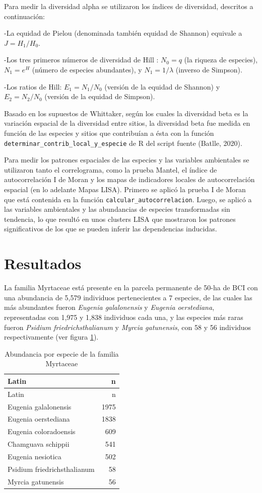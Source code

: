 \documentclass[11pt,]{article}
\begin{document}
Para medir la diversidad alpha se utilizaron los índices de diversidad,
descritos a continuación:

-La equidad de Pielou (denominada también equidad de Shannon) equivale a
\(J=H_1/H_0\).

-Los tres primeros números de diversidad de Hill : \(N_0 =q\) (la
riqueza de especies), \(N_1 = e^H\) (número de especies abundantes), y
\(N_1 = 1/\)\(\lambda\) (inverso de Simpson).

-Los ratios de Hill: \(E_1 = N_1/N_0\) (versión de la equidad de
Shannon) y \(E_2 = N_2/N_0\) (versión de la equidad de Simpson).

Basado en los supuestos de Whittaker, según los cuales la diversidad
beta es la variación espacial de la diversidad entre sitios, la
diversidad beta fue medida en función de las especies y sitios que
contribuían a ésta con la función
\texttt{determinar\_contrib\_local\_y\_especie} de R del script fuente
(Batlle, 2020).

Para medir los patrones espaciales de las especies y las variables
ambientales se utilizaron tanto el correlograma, como la prueba Mantel,
el índice de autocorrelación I de Moran y los mapas de indicadores
locales de autocorrelación espacial (en lo adelante Mapas LISA). Primero
se aplicó la prueba I de Moran que está contenida en la función
\texttt{calcular\_autocorrelacion}. Luego, se aplicó a las variables
ambientales y las abundancias de especies transformadas sin tendencia,
lo que resultó en unos clusters LISA que mostraron los patrones
significativos de los que se pueden inferir las dependencias inducidas.

\section{Resultados}\label{resultados}

La familia Myrtaceae está presente en la parcela permanente de 50-ha de
BCI con una abundancia de 5,579 individuos pertenecientes a 7 especies,
de las cuales las más abundantes fueron \emph{Eugenia galalonensis} y
\emph{Eugenia oerstediana}, representadas con 1,975 y 1,838 individuos
cada una, y las especies más raras fueron \emph{Psidium
friedrichsthalianum} y \emph{Myrcia gatunensis}, con 58 y 56 individuos
respectivamente (ver figura \ref{tab:abun_sp}).

\begin{longtable}[]{@{}lr@{}}
\caption{\label{tab:abun_sp}Abundancia por especie de la familia
Myrtaceae}\tabularnewline
\toprule
Latin & n\tabularnewline
\midrule
\endfirsthead
\toprule
Latin & n\tabularnewline
\midrule
\endhead
Eugenia galalonensis & 1975\tabularnewline
Eugenia oerstediana & 1838\tabularnewline
Eugenia coloradoensis & 609\tabularnewline
Chamguava schippii & 541\tabularnewline
Eugenia nesiotica & 502\tabularnewline
Psidium friedrichsthalianum & 58\tabularnewline
Myrcia gatunensis & 56\tabularnewline
\bottomrule
\end{longtable}
\end{document}
